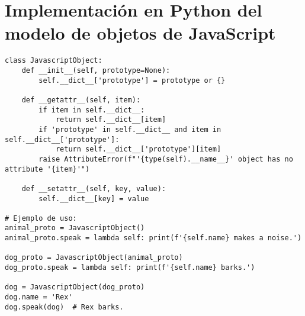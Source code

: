 \documentclass{article}
\begin{document}
\section{Implementación en Python del modelo de objetos de JavaScript}

\begin{lstlisting}
class JavascriptObject:
    def __init__(self, prototype=None):
        self.__dict__['prototype'] = prototype or {}

    def __getattr__(self, item):
        if item in self.__dict__:
            return self.__dict__[item]
        if 'prototype' in self.__dict__ and item in self.__dict__['prototype']:
            return self.__dict__['prototype'][item]
        raise AttributeError(f"'{type(self).__name__}' object has no attribute '{item}'")

    def __setattr__(self, key, value):
        self.__dict__[key] = value

# Ejemplo de uso:
animal_proto = JavascriptObject()
animal_proto.speak = lambda self: print(f'{self.name} makes a noise.')

dog_proto = JavascriptObject(animal_proto)
dog_proto.speak = lambda self: print(f'{self.name} barks.')

dog = JavascriptObject(dog_proto)
dog.name = 'Rex'
dog.speak(dog)  # Rex barks.      
\end{lstlisting}
\end{document}

